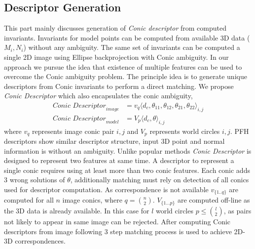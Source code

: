\documentclass{bmvc2k}
\begin{document}
\subsection{Descriptor Generation}
This part mainly discusses generation of \textit{Conic descriptor} from computed invariants. 
Invariants for model points can be computed from available 3D data ($M_i,N_i$) without any ambiguity. 
The same set of invariants can be computed a single 2D image using Ellipse backprojection with Conic ambiguity.
In our approach we pursue the idea that existence of multiple features can be used to overcome the Conic ambiguity problem. 
The principle idea is to generate unique descriptors from Conic invariants to perform a direct matching.
We propose \textit{Conic Descriptor} which also encapsulates the conic ambiguity, 
\begin{align}
\textit{Conic Descriptor}_{image} &= v_{q} \langle  d_c,\theta_{11},\theta_{12},\theta_{21},\theta_{22} \rangle_{i,j} \\
\textit{Conic Descriptor}_{model} &= V_{p} \langle d_c,\theta \rangle_{i,j}
\end{align}
where $v_{q}$ represents image conic pair $i,j$ and $V_{p}$ represents world circles $i,j$. 
PFH descriptors \cite{RusuDoctoralDissertation} show similar descriptor structure, input 3D point and normal information is without an ambiguity. 
Unlike popular methods \textit{Conic Descriptor} is designed to represent two features at same time. 
A descriptor to represent a single conic requires using at least more than two conic features. 
Each conic adds 3 wrong solutions of $ \theta $, additionally matching must rely on detection of all conics used for descriptor computation.
As correspondence is not available $ v_{\{1..q\}} $ are computed for all $ n $ image conics, where $ q = \binom{n}{2} $. 
$ V_{\{1...p\}} $ are computed off-line as the 3D data is already available. In this case for $ l $ world circles  $ p \leq \binom{l}{2} $, as pairs not likely to appear in same image can be rejected. After computing Conic descriptors from image following 3 step matching process is used to achieve 2D-3D correspondences. 

\end{document}
